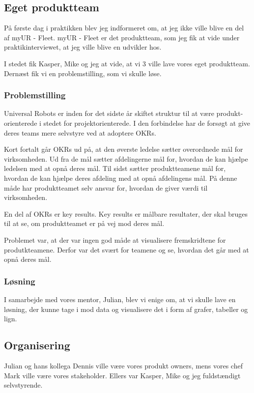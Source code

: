 \documentclass[a4paper]{article}
\begin{document}
\subsection{Eget produktteam}
\label{produktteam}
På første dag i praktikken blev jeg indformeret om,
at jeg ikke ville blive en del af myUR - Fleet.
myUR - Fleet er det produktteam, som jeg fik at vide under praktikinterviewet,
at jeg ville blive en udvikler hos.

I stedet fik Kasper, Mike og jeg at vide,
at vi 3 ville lave vores eget produktteam.
Dernæst fik vi en problemstilling, som vi skulle løse.

\subsubsection{Problemstilling}
Universal Robots er inden for det sidste år skiftet struktur til at være 
produkt-orienterede i stedet for projektorienterede.
I den forbindelse har de forsøgt at give deres teams mere selvstyre ved at 
adoptere OKRs.

Kort fortalt går OKRs ud på, 
at den øverste ledelse sætter overordnede mål for virksomheden.
Ud fra de mål sætter afdelingerne mål for,
hvordan de kan hjælpe ledelsen med at opnå deres mål.
Til sidst sætter produktteamene mål for, 
hvordan de kan hjælpe deres afdeling med at opnå afdelingens mål.
På denne måde har produktteamet selv ansvar for,
hvordan de giver værdi til virksomheden.

En del af OKRs er key results. 
Key results er målbare resultater, der skal bruges til at se,
om produktteamet er på vej mod deres mål.

Problemet var, at der var ingen god måde at visualisere 
fremskridtene for produtkteamene.
Derfor var det svært for teamene og se, hvordan det går med at opnå deres mål.

\subsubsection{Løsning}
I samarbejde med vores mentor, Julian, blev vi enige om, at vi skulle lave en 
løsning, der kunne tage i mod data og visualisere det i form af 
grafer, tabeller og lign.

\subsection{Organisering}
\label{organisering}
Julian og hans kollega Dennis ville være vores produkt owners,
mens vores chef Mark ville være vores stakeholder.
Ellers var Kasper, Mike og jeg fuldstændigt selvstyrende.
\end{document}
